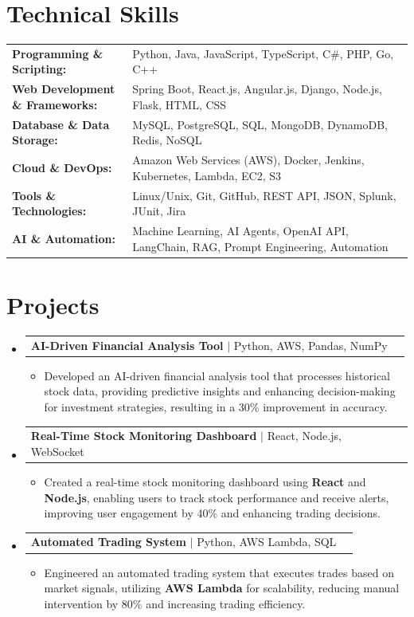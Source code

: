 \documentclass[letterpaper,10pt]{article}
\makeatletter
\newcommand{\resumeItem}[1]{
  \item{\fontsize{8pt}{9pt}\selectfont
    #1 \vspace{-3pt}
  }
}
\newcommand{\resumeProjectHeading}[2]{
    \item
    \begin{tabular*}{1.001\textwidth}{l@{\extracolsep{\fill}}r}
      \fontsize{8.5pt}{10pt}#1 & \textbf{\fontsize{8.5pt}{10pt} #2}\\
    \end{tabular*}\vspace{-7pt}
}
\newcommand{\resumeSubHeadingListStart}{\begin{itemize}[leftmargin=0pt, label={}]}
\newcommand{\resumeSubHeadingListEnd}{\end{itemize}}
\newcommand{\resumeItemListStart}{\begin{itemize}[leftmargin=*]}
\newcommand{\resumeItemListEnd}{\end{itemize}\vspace{-5pt}}
\makeatother
\begin{document}
\section{Technical Skills}
        \vspace{-14pt}
        \begin{table}[h]
            \fontsize{8pt}{9pt}\selectfont
            \begin{tabular}{p{0.3\linewidth} p{0.7\linewidth}}
                \textbf{Programming \& Scripting:} & Python, Java, JavaScript, TypeScript, C\#, PHP, Go, C++ \\
                \textbf{Web Development \& Frameworks:} & Spring Boot, React.js, Angular.js, Django, Node.js, Flask, HTML, CSS \\
                \textbf{Database \& Data Storage:} & MySQL, PostgreSQL, SQL, MongoDB, DynamoDB, Redis, NoSQL \\
                \textbf{Cloud \& DevOps:} & Amazon Web Services (AWS), Docker, Jenkins, Kubernetes, Lambda, EC2, S3 \\
                \textbf{Tools \& Technologies:} & Linux/Unix, Git, GitHub, REST API, JSON, Splunk, JUnit, Jira \\
                \textbf{AI \& Automation:} & Machine Learning, AI Agents, OpenAI API, LangChain, RAG, Prompt Engineering, Automation \\
            \end{tabular}
        \end{table}
 \vspace{-18pt}

\section{Projects}
    \vspace{-5pt}
    \resumeSubHeadingListStart
          \resumeProjectHeading
            {\textbf{AI-Driven Financial Analysis Tool} $|$ Python, AWS, Pandas, NumPy}{}
            \resumeItemListStart
                \resumeItem{Developed an AI-driven financial analysis tool that processes historical stock data, providing predictive insights and enhancing decision-making for investment strategies, resulting in a 30\% improvement in accuracy.}
            \resumeItemListEnd
        \vspace{-12pt}
    
        \resumeProjectHeading
            {\textbf{Real-Time Stock Monitoring Dashboard} $|$ React, Node.js, WebSocket}{}
        \resumeItemListStart
                \resumeItem{Created a real-time stock monitoring dashboard using \textbf{React} and \textbf{Node.js}, enabling users to track stock performance and receive alerts, improving user engagement by 40\% and enhancing trading decisions.}
        \resumeItemListEnd
      \vspace{-12pt}
      \resumeProjectHeading
        {\textbf{Automated Trading System} $|$ Python, AWS Lambda, SQL}{}
    \resumeItemListStart
            \resumeItem{Engineered an automated trading system that executes trades based on market signals, utilizing \textbf{AWS Lambda} for scalability, reducing manual intervention by 80\% and increasing trading efficiency.}
    \resumeItemListEnd
    \resumeSubHeadingListEnd
\end{document}
